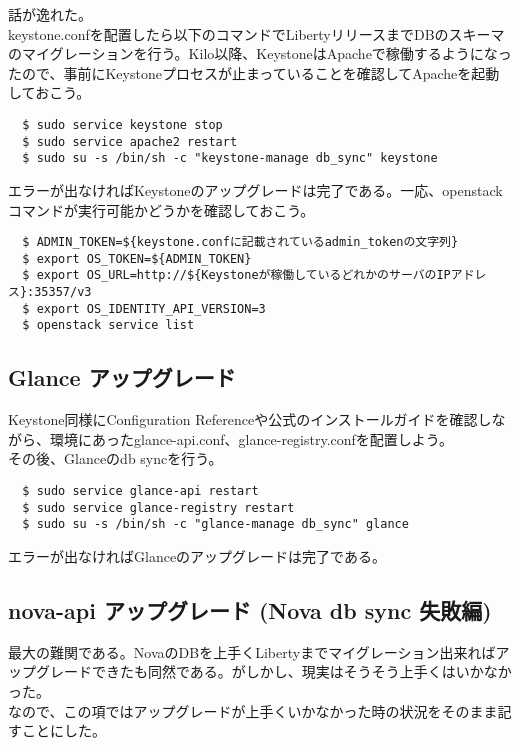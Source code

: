 \documentclass[9pt,b5paper,tombo,openany]{jsbook}
\begin{document}
話が逸れた。\\[1ex]


keystone.confを配置したら以下のコマンドでLibertyリリースまでDBのスキーマのマイグレーションを行う。Kilo以降、KeystoneはApacheで稼働するようになったので、事前にKeystoneプロセスが止まっていることを確認してApacheを起動しておこう。

\begin{lstlisting}
  $ sudo service keystone stop
  $ sudo service apache2 restart
  $ sudo su -s /bin/sh -c "keystone-manage db_sync" keystone
\end{lstlisting}

エラーが出なければKeystoneのアップグレードは完了である。一応、openstackコマンドが実行可能かどうかを確認しておこう。

\begin{lstlisting}
  $ ADMIN_TOKEN=${keystone.confに記載されているadmin_tokenの文字列}
  $ export OS_TOKEN=${ADMIN_TOKEN}
  $ export OS_URL=http://${Keystoneが稼働しているどれかのサーバのIPアドレス}:35357/v3
  $ export OS_IDENTITY_API_VERSION=3
  $ openstack service list
\end{lstlisting}

\subsection{Glance アップグレード}
Keystone同様にConfiguration Referenceや公式のインストールガイドを確認しながら、環境にあったglance-api.conf、glance-registry.confを配置しよう。\\[1ex]

\noindent
その後、Glanceのdb syncを行う。

\begin{lstlisting}
  $ sudo service glance-api restart
  $ sudo service glance-registry restart
  $ sudo su -s /bin/sh -c "glance-manage db_sync" glance
\end{lstlisting}

\noindent
エラーが出なければGlanceのアップグレードは完了である。

\subsection{nova-api アップグレード (Nova db sync 失敗編)}
最大の難関である。NovaのDBを上手くLibertyまでマイグレーション出来ればアップグレードできたも同然である。がしかし、現実はそうそう上手くはいかなかった。\\[1ex]

\noindent
なので、この項ではアップグレードが上手くいかなかった時の状況をそのまま記すことにした。
\end{document}
